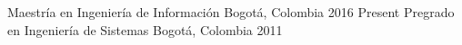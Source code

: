 

\begin{cventries}
  \vspace{-0.9cm}
  \cventry{}{}{}{}{}
  {Maestría en Ingeniería de Información} %
  {Bogotá, Colombia} %
  {2016 \- Present}{}
  {Pregrado en Ingeniería de Sistemas} %
  {Bogotá, Colombia} %
  {2011 }{}
  \vspace{-0.3cm}
\end{cventries}
